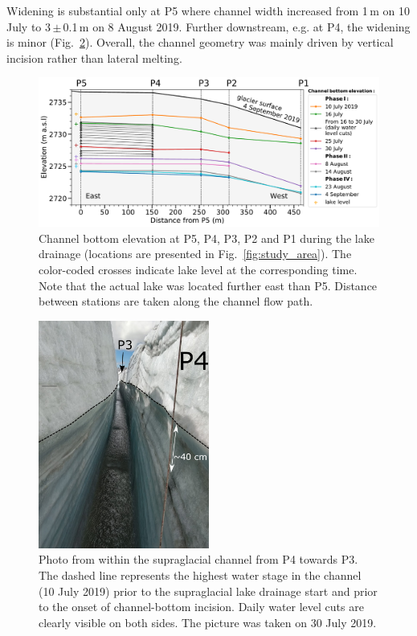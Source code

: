 Widening is substantial only at P5 where channel width increased from 1\,m on 10 July to 3\,$\pm$\,0.1\,m on 8 August 2019. Further downstream, e.g. at P4, the widening is minor (Fig.~\ref{fig:picture_channel}). Overall, the channel geometry was mainly driven by vertical incision rather than lateral melting.


\begin{figure}[h]
    \centering
    \includegraphics[width=1\textwidth]{chapters/chapter_plainemorte/fig03.pdf}
    \caption{Channel bottom elevation at P5, P4, P3, P2 and P1 during the lake drainage (locations are presented in Fig.~\ref{fig:study_area}). The color-coded crosses indicate lake level at the corresponding time.  Note that the actual lake was located further east than P5.  Distance between stations are taken along the channel flow path.}
    \label{canal_profile}
\end{figure}


\begin{figure}[h]
    \centering
    \includegraphics[width=0.5\textwidth]{chapters/chapter_plainemorte/fig04.pdf}
    \caption{Photo from within the supraglacial channel from P4 towards P3. The dashed line represents the highest water stage in the channel (10 July 2019) prior to the supraglacial lake drainage start and prior to the onset of channel-bottom incision. Daily water level cuts are clearly visible on both sides. The picture was taken on 30 July 2019.}
    \label{fig:picture_channel}
\end{figure}

